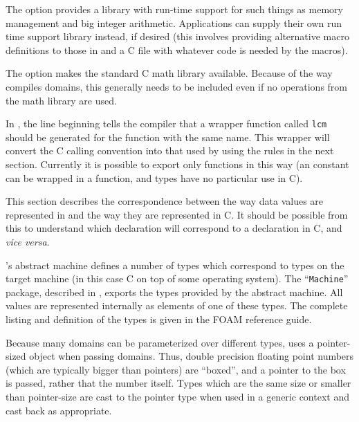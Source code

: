 The  option provides a library with run-time support for
such things as memory management and  big integer arithmetic.
Applications can supply their own run time support library instead, if desired
(this involves providing alternative macro definitions to those
in  and a C file with whatever code is needed by the macros).

The  option makes the standard C math library available.
 Because of
the way \asharp{} compiles domains, this generally needs to be
included even if no operations from the math library are used.

In , the line beginning  tells the
compiler that a wrapper function called {\tt lcm} should be generated
for the \asharp{} function with the same name. This wrapper will
convert the C calling convention into that used by
\asharp{} using the rules in the next section. Currently it is
possible to export only functions in this way (an \asharp{} constant
can be wrapped in a function, and types have no particular use in C).


This section describes the correspondence between the way data values are
represented in \asharp{} and the way they are represented in C.
It should be possible from this to understand which \asharp{}
declaration will correspond to a declaration in C, and {\em vice versa\/}.

\asharp{}'s abstract machine defines a number of types which
correspond to types on the target machine (in this case C on top of
some operating system). 
The ``{\tt Machine}'' package, described in ,
exports the types provided by the abstract machine.
All \asharp{} values are represented internally as
elements of one of these types. 
The complete listing and definition of
the types is given in the FOAM reference guide.  

Because many \asharp{} domains can be parameterized over different
types, \asharp{} uses a pointer-sized object when passing
domains. Thus, double precision floating point numbers (which are
typically bigger than pointers)  are ``boxed'',
and a pointer to the box is passed, rather that the number
itself. Types which are the same size or smaller than pointer-size are
cast to the pointer type when used in a generic context and cast back
as appropriate.

